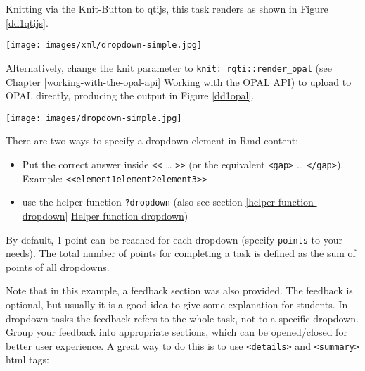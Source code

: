 \documentclass[twoside]{tufte-book}
\providecommand{\tightlist}{%
  \setlength{\itemsep}{0pt}\setlength{\parskip}{0pt}}
\begin{document}
Knitting via the Knit-Button to qtijs, this task renders as shown in Figure \ref{dd1qtijs}.

\begin{figure*}
\centering
\texttt{[image: images/xml/dropdown-simple.jpg]}
\caption{\label{dd1qtijs}Simple dropdown task rendered in qtijs}
\end{figure*}

\noindent Alternatively, change the knit parameter to \texttt{knit:\ rqti::render\_opal} (see Chapter \ref{working-with-the-opal-api} \href{api_opal.html}{Working with the OPAL API}) to upload to OPAL directly, producing the output in Figure \ref{dd1opal}.

\begin{figure*}
\centering
\texttt{[image: images/dropdown-simple.jpg]}
\caption{\label{dd1opal}Simple dropdown task rendered in OPAL}
\end{figure*}

There are two ways to specify a dropdown-element in Rmd content:

\begin{itemize}
\tightlist
\item
  Put the correct answer inside \texttt{\textless{}\textless{}} \ldots{} \texttt{\textgreater{}\textgreater{}} (or the equivalent \texttt{\textless{}gap\textgreater{}} \ldots{} \texttt{\textless{}/gap\textgreater{}}). Example: \texttt{\textless{}\textless{}element1\textbar{}element2\textbar{}element3\textgreater{}\textgreater{}}
\item
  use the helper function \texttt{?dropdown} (also see section \ref{helper-function-dropdown} \hyperref[helper-function-dropdown]{Helper function dropdown})
\end{itemize}

By default, 1 point can be reached for each dropdown (specify \texttt{points} to your needs). The total number of points for completing a task is defined as the sum of points of all dropdowns.

Note that in this example, a feedback section was also provided. The feedback is
optional, but usually it is a good idea to give some explanation for students. In dropdown tasks the feedback refers to the whole task, not to a specific dropdown. Group your feedback into appropriate sections, which can be opened/closed for better user experience. A great way to do this is to use \texttt{\textless{}details\textgreater{}} and \texttt{\textless{}summary\textgreater{}} html tags:
\end{document}
